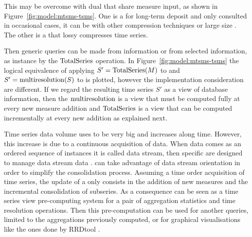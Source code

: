 This may be overcome with dual  that share measure input,
as shown in Figure~\ref{fig:model:mtsms-tsms}. One is a 
for long-term deposit and only consulted in occasional cases, it can
be  with other compression techniques or large size
. The other is a  that lossy compresses time
series.

Then generic queries can be made from  information or from
 selected information, as instance by the $\operatorname{TotalSeries}$
operation. In Figure~\ref{fig:model:mtsms-tsms} the logical
equivalence of applying $S'=\operatorname{TotalSeries}(M)$ to  and
$S'=\operatorname{multiresolution}(S)$ to  is plotted, however the
implementation consideration are different. If we regard the resulting
time series $S'$ as a view of database information, then the
$\operatorname{multiresolution}$ is a view that must be computed fully at every new
measure addition and $\operatorname{TotalSeries}$ is a view that can be computed
incrementally at every new addition as explained next.


Time series data volume uses to be very big and increases along
time. However, this increase is due to a continuous acquisition of
data. When data comes as an ordered sequence of instances it is called
data stream, then specific  are designed to manage data
stream data \cite{stonebraker05:sigmod}.   can take
advantage of data stream orientation in order to simplify the
consolidation process.  Assuming a time order acquisition of time
series, the update of a  only consists in the addition of
new measures and the incremental consolidation of subseries.  As a
consequence  can be seen as a time series view
pre-computing system for a pair of aggregation statistics and time
resolution operations.  Then this pre-computation can be used for
another queries, limited to the aggregations previously computed, or
for graphical visualisations like the ones done by RRDtool
\cite{rrdtool}.







